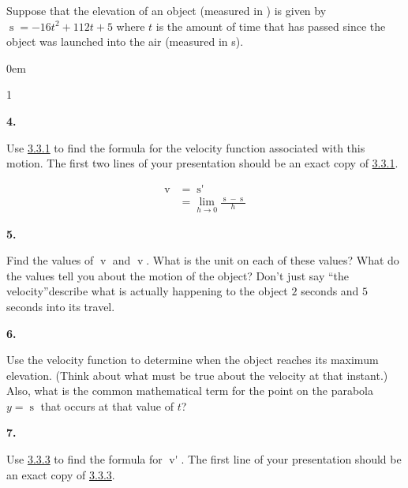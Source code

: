 \documentclass[12pt,]{book}
\theoremstyle{plain}
\theoremstyle{definition}
\numberwithin{equation}{section}
\newenvironment{exercisegroup}%
{\medskip\noindent}%
{\par\bigskip}%
\newlength{\exercisegroupindent}%
\newlength{\exercisegroupitemwidth}%
\newenvironment{exercisegrouplist}%
{\vspace{-\partopsep}%
\begin{adjustwidth}{\exercisegroupindent}{0em}}%
{\end{adjustwidth}%
\vspace{-\partopsep}%
\vspace{\baselineskip}}%
\newenvironment{exercisegroupbycol}[1]%
{\begin{exercisegrouplist}%
\vspace{-\multicolsep}%
\begin{multicols}{#1}%
\setlength{\parindent}{0em}%
\setlength{\exercisegroupitemwidth}{\linewidth}}%
{\end{multicols}%
\vspace{-\multicolsep}%
\end{exercisegrouplist}}%
\newenvironment{exercisegroupitem}[1]%
{\begin{minipage}[t]{\exercisegroupitemwidth}
\vspace{0pt}%
{\bfseries#1}%
\rule{0pt}{\baselineskip}}{\strut%
\end{minipage}%
\hspace{\columnsep}}%
\providecommand\phantomsection{}
\newcommand{\fe}[2]{\mathop{{#1}{\left(#2\right)}}}
\newcommand{\fd}[1]{#1'}
\begin{document}
\begin{exercisegroup}%
Suppose that the elevation of an object (measured in \si{\foot}) is given by \(\fe{s}{t}=-16t^2+112t+5\) where \(t\) is the amount of time that has passed since the object was launched into the air (measured in \si{\second}).%
\begin{exercisegroupbycol}{1}%
\begin{exercisegroupitem}{4. }\phantomsection\hypertarget{exercise-131}{\null}
Use \hyperref[instantaneous-velocity-equation]{3.3.1} to find the formula for the velocity function associated with this motion. The first two lines of your presentation should be an exact copy of \hyperref[instantaneous-velocity-equation]{3.3.1}.%
\par
\begin{align}
\fe{v}{t}&=\fe{\fd{s}}{t}\label{instantaneous-velocity-equation}\\
&=\lim_{h\to0}\frac{\fe{s}{t+h}-\fe{s}{t}}{h}\label{mrow-97}
\end{align}%
\end{exercisegroupitem}%
\par%
\begin{exercisegroupitem}{5. }\phantomsection\hypertarget{exercise-132}{\null}
Find the values of \(\fe{v}{2}\) and \(\fe{v}{5}\). What is the unit on each of these values? What do the values tell you about the motion of the object? Don't just say ``the velocity''\textemdash{}describe what is actually happening to the object \(2\) seconds and \(5\) seconds into its travel.%
\end{exercisegroupitem}%
\par%
\begin{exercisegroupitem}{6. }\phantomsection\hypertarget{exercise-133}{\null}
 Use the velocity function to determine when the object reaches its maximum elevation. (Think about what must be true about the velocity at that instant.) Also, what is the common mathematical term for the point on the parabola \(y=\fe{s}{t}\) that occurs at that value of \(t\)?%
\end{exercisegroupitem}%
\par%
\begin{exercisegroupitem}{7. }\phantomsection\hypertarget{exercise-134}{\null}
Use \hyperref[instantaneous-acceleration-equation]{3.3.3} to find the formula for \(\fe{\fd{v}}{t}\). The first line of your presentation should be an exact copy of \hyperref[instantaneous-acceleration-equation]{3.3.3}.%
\par
\begin{align}

\end{align}
\end{exercisegroupitem}
\end{exercisegroupbycol}
\end{exercisegroup}
\end{document}
